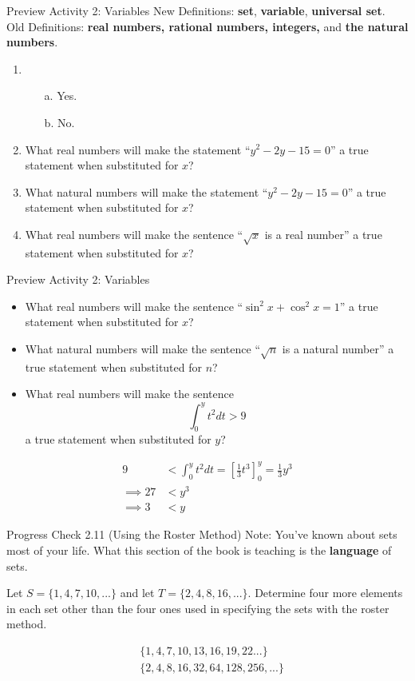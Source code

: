 \documentclass{beamer}
\begin{document}
\begin{frame}{Preview Activity 2: Variables}
	New Definitions: \textbf{set}, \textbf{variable}, \textbf{universal set}.\\
	Old Definitions: \textbf{real numbers, rational numbers, integers,} and \textbf{the natural numbers}.
	\begin{enumerate}
	    \item \begin{enumerate}
	        \item[a.] Yes.
	        \item[b.] No.
	    \end{enumerate}
		\item What real numbers will make the statement ``$y^2 - 2y - 15 = 0$'' a true statement when substituted for $x$? \pause
		\item What natural numbers will make the statement ``$y^2 - 2y - 15 = 0$'' a true statement when substituted for $x$? \pause
		\item What real numbers will make the sentence ``$\sqrt{x}$ is a real number'' a true statement when substituted for $x$?
	\end{enumerate}
\end{frame}

\begin{frame}{Preview Activity 2: Variables}
	\begin{itemize} 
		\item What real numbers will make the sentence ``$\sin^2 x + \cos^2 x = 1$'' a true statement when substituted for $x$? \pause
		\item What natural numbers will make the sentence ``$\sqrt{n}$ is a natural number'' a true statement when substituted for $n$? \pause
		\item What real numbers will make the sentence
		\[
		\int_{0}^{y} t^2 dt > 9
		\]
		a true statement when substituted for $y$?
	\end{itemize}
	\pause
	\[
	\begin{aligned}
	9 &< \int_0^y t^2 dt = \left[\frac{1}{3}t^3 \right]_0^y = \frac{1}{3}y^3\\
	\implies 27 &< y^3\\
	\implies 3 &< y
	\end{aligned}
	\]
\end{frame}

\begin{frame}{Progress Check 2.11 (Using the Roster Method)}
	Note: You've known about sets most of your life.  What this section of the book is teaching is the \textbf{language} of sets.\\[.2 in] \pause
	
	Let $S = \{1, 4, 7, 10, ...\}$ and let $T = \{2, 4, 8, 16, ...\}.$  Determine four more elements in each set other than the four ones used in specifying the sets with the roster method.\pause
	
	\[
	\begin{aligned}
	&\{1, 4, 7, 10, 13, 16, 19, 22 ...\}\\
	&\{2, 4, 8, 16, 32, 64, 128, 256, ...\}
	\end{aligned}
	\]
\end{frame}
\end{document}
